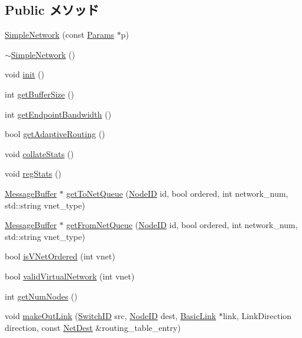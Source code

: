 \subsection*{Public メソッド}
\begin{DoxyCompactItemize}
\item 
\hyperlink{classSimpleNetwork_a29ff459fd60dd92b122e772fcb931a03}{SimpleNetwork} (const \hyperlink{classSimpleNetwork_acfd32ca05df7999ec705e4800d022dbf}{Params} $\ast$p)
\item 
\hyperlink{classSimpleNetwork_a8cfee54f29326681efd0c8df51b6f197}{$\sim$SimpleNetwork} ()
\item 
void \hyperlink{classSimpleNetwork_a02fd73d861ef2e4aabb38c0c9ff82947}{init} ()
\item 
int \hyperlink{classSimpleNetwork_adaa0495495ece419f5911bc378971502}{getBufferSize} ()
\item 
int \hyperlink{classSimpleNetwork_a51a3a1351914cb6da4e32265806c3b65}{getEndpointBandwidth} ()
\item 
bool \hyperlink{classSimpleNetwork_aec4d81a042f35c92fa51a3721a8ed203}{getAdaptiveRouting} ()
\item 
void \hyperlink{classSimpleNetwork_a208669cbc0bb1d52565956ca8c690c55}{collateStats} ()
\item 
void \hyperlink{classSimpleNetwork_a4dc637449366fcdfc4e764cdf12d9b11}{regStats} ()
\item 
\hyperlink{classMessageBuffer}{MessageBuffer} $\ast$ \hyperlink{classSimpleNetwork_a4b74c5f7524d071a8cb6137eca7942bd}{getToNetQueue} (\hyperlink{TypeDefines_8hh_a83c14b4ae37e80071f6b3506a6c46151}{NodeID} id, bool ordered, int network\_\-num, std::string vnet\_\-type)
\item 
\hyperlink{classMessageBuffer}{MessageBuffer} $\ast$ \hyperlink{classSimpleNetwork_a8689f6299b0ac00d6ae6075a60829884}{getFromNetQueue} (\hyperlink{TypeDefines_8hh_a83c14b4ae37e80071f6b3506a6c46151}{NodeID} id, bool ordered, int network\_\-num, std::string vnet\_\-type)
\item 
bool \hyperlink{classSimpleNetwork_a52d31485b47857b8e7eb4a89efdf56a6}{isVNetOrdered} (int vnet)
\item 
bool \hyperlink{classSimpleNetwork_adf94d17da461ce5960923fec76cf70b5}{validVirtualNetwork} (int vnet)
\item 
int \hyperlink{classSimpleNetwork_a52ab76ba6f0a40a06c6fc4043351824e}{getNumNodes} ()
\item 
void \hyperlink{classSimpleNetwork_a87915d87a2b4c11ae5f0f4da31bd2375}{makeOutLink} (\hyperlink{TypeDefines_8hh_ac925a332c83eaf1e40e056e7a20ebcd8}{SwitchID} src, \hyperlink{TypeDefines_8hh_a83c14b4ae37e80071f6b3506a6c46151}{NodeID} dest, \hyperlink{classBasicLink}{BasicLink} $\ast$link, LinkDirection direction, const \hyperlink{classNetDest}{NetDest} \&routing\_\-table\_\-entry)

\end{DoxyCompactItemize}
